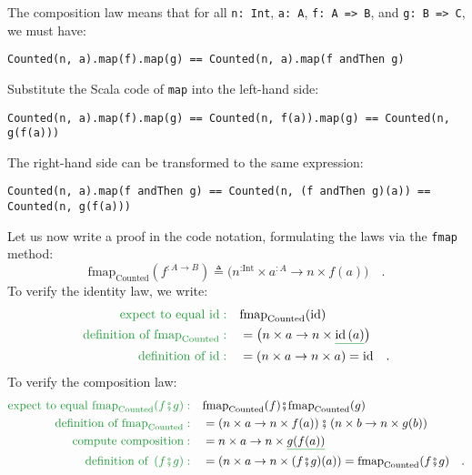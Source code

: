 The composition law means that for all \lstinline!n: Int!, \lstinline!a: A!,
\lstinline!f: A => B!, and \lstinline!g: B => C!, we must have:
\begin{lstlisting}
Counted(n, a).map(f).map(g) == Counted(n, a).map(f andThen g)
\end{lstlisting}
Substitute the Scala code of \lstinline!map! into the left-hand side:
\begin{lstlisting}
Counted(n, a).map(f).map(g) == Counted(n, f(a)).map(g) == Counted(n, g(f(a)))
\end{lstlisting}
The right-hand side can be transformed to the same expression:
\begin{lstlisting}
Counted(n, a).map(f andThen g) == Counted(n, (f andThen g)(a)) == Counted(n, g(f(a)))
\end{lstlisting}

Let us now write a proof in the code notation, formulating the laws
via the \lstinline!fmap! method:
\[
\text{fmap}_{\text{Counted}}(f^{:A\rightarrow B})\triangleq\big(n^{:\text{Int}}\times a^{:A}\rightarrow n\times f(a)\big)\quad.
\]
To verify the identity law, we write:
\begin{align*}
{\color{greenunder}\text{expect to equal }\text{id}:}\quad & \text{fmap}_{\text{Counted}}(\text{id})\\
{\color{greenunder}\text{definition of }\text{fmap}_{\text{Counted}}:}\quad & =\big(n\times a\rightarrow n\times\gunderline{\text{id}\,(a)}\big)\\
{\color{greenunder}\text{definition of }\text{id}:}\quad & =\left(n\times a\rightarrow n\times a\right)=\text{id}\quad.
\end{align*}
To verify the composition law:
\begin{align*}
{\color{greenunder}\text{expect to equal }\text{fmap}_{\text{Counted}}(f\bef g):}\quad & \text{fmap}_{\text{Counted}}(f)\bef\text{fmap}_{\text{Counted}}(g)\\
{\color{greenunder}\text{definition of }\text{fmap}_{\text{Counted}}:}\quad & =\left(n\times a\rightarrow n\times f(a)\right)\bef\left(n\times b\rightarrow n\times g(b)\right)\\
{\color{greenunder}\text{compute composition}:}\quad & =n\times a\rightarrow n\times\gunderline{g(f(a))}\\
{\color{greenunder}\text{definition of }\left(f\bef g\right):}\quad & =\left(n\times a\rightarrow n\times(f\bef g)(a)\right)=\text{fmap}_{\text{Counted}}(f\bef g)\quad.
\end{align*}

